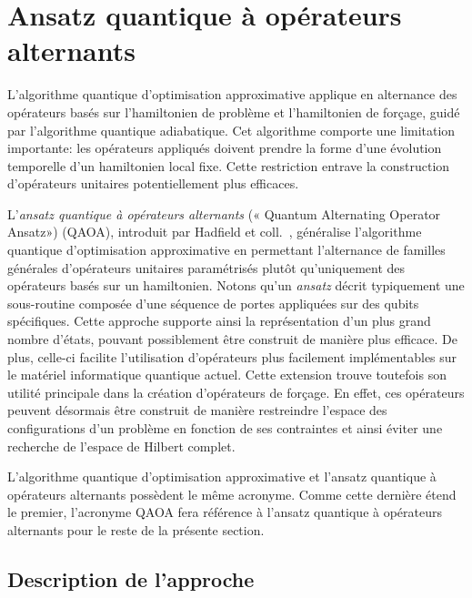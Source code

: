 
\section{Ansatz quantique à opérateurs alternants}
\label{sec:ansatz-quantique-a-operateurs-alternants}

L'algorithme quantique d'optimisation approximative applique en alternance des opérateurs basés sur l'hamiltonien de problème et l'hamiltonien de forçage, guidé par l'algorithme quantique adiabatique. Cet algorithme comporte une limitation importante: les opérateurs appliqués doivent prendre la forme d'une évolution temporelle d'un hamiltonien local fixe. Cette restriction entrave la construction d'opérateurs unitaires potentiellement plus efficaces.

L'\textit{ansatz quantique à opérateurs alternants} (« Quantum Alternating Operator Ansatz») (QAOA), introduit par Hadfield et coll.~\cite{hadfieldQuantumApproximateOptimization2019}, généralise l'algorithme quantique d'optimisation approximative en permettant l'alternance de familles générales d'opérateurs unitaires paramétrisés plutôt qu'uniquement des opérateurs basés sur un hamiltonien. Notons qu'un \textit{ansatz} décrit typiquement une sous-routine composée d'une séquence de portes appliquées sur des qubits spécifiques. Cette approche supporte ainsi la représentation d'un plus grand nombre d'états, pouvant possiblement être construit de manière plus efficace. De plus, celle-ci facilite l'utilisation d'opérateurs plus facilement implémentables sur le matériel informatique quantique actuel. Cette extension trouve toutefois son utilité principale dans la création d'opérateurs de forçage. En effet, ces opérateurs peuvent désormais être construit de manière restreindre l'espace des configurations d'un problème en fonction de ses contraintes et ainsi éviter une recherche de l'espace de Hilbert complet. 

L'algorithme quantique d'optimisation approximative et l'ansatz quantique à opérateurs alternants possèdent le même acronyme. Comme cette dernière étend le premier, l'acronyme QAOA fera référence à l'ansatz quantique à opérateurs alternants pour le reste de la présente section.


\subsection{Description de l'approche}

